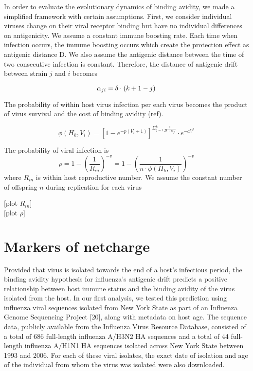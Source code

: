 \documentclass{article}
\begin{document}
In order to evaluate the evolutionary dynamics of binding avidity, we made a simplified framework with certain assumptions. First, we consider individual viruses change on their viral receptor binding but have no individual differences on antigenicity. We assume a constant immune boosting rate. Each time when infection occurs, the immune boosting occurs which create the protection effect as antigenic distance D. We also assume the antigenic distance between the time of two consecutive infection is constant. Therefore, the distance of antigenic drift between strain $j$ and $i$ becomes

\begin{equation}
 \alpha_{ji} = \delta\cdot (k+1-j) \\
\end{equation}

The probability of within host virus infection per each virus becomes the product of virus survival and the cost of binding avidity (ref). 

\begin{equation}
  \phi(H_{k},V_{i}) = [1-e^{-p(V_{i}+1)}]^{\Sigma_{j=1}^{k}\frac{1}{D+\alpha_{ji}}} \cdot e^{-aV^{b}}
\end{equation} 


The probability of viral infection is 
\begin{equation}
\rho=1-(\frac{1}{R_{in}})^{-v}
=1-(\frac{1}{n \cdot \phi(H_{k},V_{i})})^{-v}
\end{equation}
where $R_{in}$ is within host reproductive number. We assume the constant number of offspring $n$ during replication for each virus 
 
[plot $R_{in}$] \\

[plot $\rho$]
                
                
                
                \section{Markers of netcharge}
                Provided that virus is isolated towards the end of a host’s infectious period, the binding avidity hypothesis for influenza’s antigenic drift predicts a positive relationship between host immune status and the binding avidity of the virus isolated from the host. In our first analysis, we tested this prediction using influenza viral sequences isolated from New York State as part of an Influenza Genome Sequencing Project [20], along with metadata on host age. The sequence data, publicly available from the Influenza Virus Resource Database, consisted of a total of 686 full-length influenza A/H3N2 HA sequences and a total of 44 full-length influenza A/H1N1 HA sequences isolated across New York State between 1993 and 2006. For each of these viral isolates, the exact date of isolation and age of the individual from whom the virus was isolated were also downloaded.\\
                 
\end{document}
